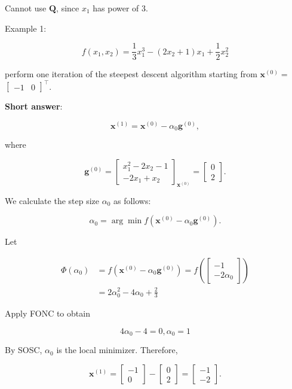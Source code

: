 Cannot use \(\boldsymbol{Q}\), since \(x_{1}\) has power of 3.

Example 1:

\[
	f\left(x_{1}, x_{2}\right)=\frac{1}{3} x_{1}^{3}-\left(2 x_{2}+1\right) x_{1}+\frac{1}{2} x_{2}^{2}
\]

perform one iteration of the steepest descent algorithm starting from \(\boldsymbol{x}^{(0)}=\) \(\left[\begin{array}{ll}-1 & 0\end{array}\right]^{\top}\).

\textbf{Short answer}:

\[
	\boldsymbol{x}^{(1)}=\boldsymbol{x}^{(0)}-\alpha_{0} \boldsymbol{g}^{(0)},
\]

where

\[
	\boldsymbol{g}^{(0)}=\left[\begin{array}{c}
		x_{1}^{2}-2 x_{2}-1 \\
		-2 x_{1}+x_{2}
	\end{array}\right]_{\boldsymbol{x}^{(0)}}=\left[\begin{array}{l}
		0 \\
		2
	\end{array}\right] .
\]

We calculate the step size \(\alpha_{0}\) as follows:

\[
	\alpha_{0}=\arg \min f\left(\boldsymbol{x}^{(0)}-\alpha_{0} \boldsymbol{g}^{(0)}\right) .
\]

Let

\[
	\begin{aligned}
		\Phi\left(\alpha_{0}\right) & =f\left(\boldsymbol{x}^{(0)}-\alpha_{0} \boldsymbol{g}^{(0)}\right)=f\left(\left[\begin{array}{c}
			-1 \\
			-2 \alpha_{0}
		\end{array}\right]\right) \\
		& =2 \alpha_{0}^{2}-4 \alpha_{0}+\frac{2}{3}
	\end{aligned}
\]

Apply FONC to obtain

\[
	4 \alpha_{0}-4=0, \alpha_{0}=1
\]

By SOSC, \(\alpha_{0}\) is the local minimizer. Therefore,

\[
	\boldsymbol{x}^{(1)}=\left[\begin{array}{c}
		-1 \\
		0
	\end{array}\right]-\left[\begin{array}{l}
		0 \\
		2
	\end{array}\right]=\left[\begin{array}{l}
		-1 \\
		-2
	\end{array}\right] .
\]


